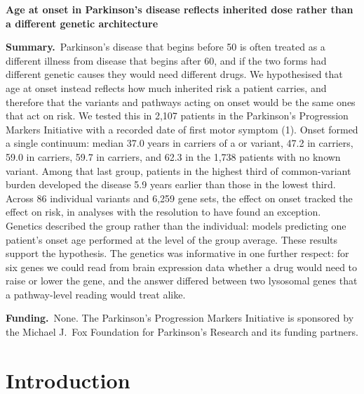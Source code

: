 \documentclass[10pt]{article}
\begin{document}
\thispagestyle{empty}
\vspace*{2mm}
{\sffont\bfseries\fontsize{16}{19.5}\selectfont
Age at onset in Parkinson's disease reflects inherited dose rather than a
different genetic architecture\par}

\vspace{6mm}
{\small
\noindent\textbf{Summary.}~Parkinson's disease that begins before 50 is often
treated as a different illness from disease that begins after 60, and if the two
forms had different genetic causes they would need different drugs. We
hypothesised that age at onset instead reflects how much inherited risk a
patient carries, and therefore that the variants and pathways acting on onset
would be the same ones that act on risk. We tested this in 2,107 patients in the Parkinson's Progression Markers Initiative with a recorded date of first motor symptom (1). Onset formed a single continuum: median 37.0 years in carriers of a
 or  variant, 47.2 in  carriers, 59.0 in
 carriers, 59.7 in  carriers, and 62.3 in the 1,738
patients with no known variant. Among that last group, patients in the highest
third of common-variant burden developed the disease 5.9 years earlier than
those in the lowest third. Across 86 individual variants and 6,259 gene sets, the effect on onset tracked the effect on risk, in analyses with the resolution to have found an exception. Genetics described the group rather than the individual: models predicting one patient's onset age performed at the level of the group average. These results support the hypothesis. The genetics was
informative in one further respect: for six genes we could read from brain
expression data whether a drug would need to raise or lower the gene, and the
answer differed between two lysosomal genes that a pathway-level reading would
treat alike.\par
\vspace{1.5mm}
\noindent\textbf{Funding.}~None. The Parkinson's Progression Markers Initiative
is sponsored by the Michael J.\ Fox Foundation for Parkinson's Research and its
funding partners.\par}

\vspace{5mm}

\section*{Introduction}
\end{document}
